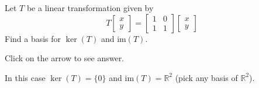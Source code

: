 \documentclass{ximera}
\begin{document}
\begin{problem}\label{prb:6.29}
 Let $T$ be a linear transformation given by
\[
T \left[ \begin{array}{r}
x\\
y
\end{array}\right] = \left[ \begin{array}{rrr}
1 & 0  \\
1 & 1
\end{array}\right]
\left[ \begin{array}{r}
x\\
y
\end{array}\right]
\]
Find a basis for $\ker \left( T\right)$ and $\mbox{im}
\left( T\right) $.

Click on the arrow to see answer.

\begin{expandable}
In this case $\ker \left( T\right) =\{0\}$
and $\mbox{im} \left( T\right) = \mathbb{R}^2$ (pick any basis of $\mathbb{R}^2$).
\end{expandable}

\end{problem}




\end{document}
